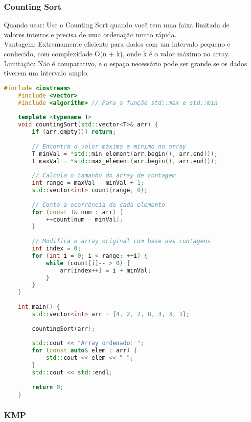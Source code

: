 \documentclass{article}
\begin{document}
\subsubsection{Counting Sort}

Quando usar: Use o Counting Sort quando você tem uma faixa limitada de valores inteiros e precisa de uma ordenação muito rápida.
\\Vantagem: Extremamente eficiente para dados com um intervalo pequeno e conhecido, com complexidade O(n + k), onde k é o valor máximo no array.
\\Limitação: Não é comparativo, e o espaço necessário pode ser grande se os dados tiverem um intervalo amplo.

\begin{lstlisting}[language=C++, caption=counting sort]
    #include <iostream>
    #include <vector>
    #include <algorithm> // Para a função std::max e std::min
    
    template <typename T>
    void countingSort(std::vector<T>& arr) {
        if (arr.empty()) return;
    
        // Encontra o valor máximo e mínimo no array
        T minVal = *std::min_element(arr.begin(), arr.end());
        T maxVal = *std::max_element(arr.begin(), arr.end());
    
        // Calcula o tamanho do array de contagem
        int range = maxVal - minVal + 1;
        std::vector<int> count(range, 0);
    
        // Conta a ocorrência de cada elemento
        for (const T& num : arr) {
            ++count[num - minVal];
        }
    
        // Modifica o array original com base nas contagens
        int index = 0;
        for (int i = 0; i < range; ++i) {
            while (count[i]-- > 0) {
                arr[index++] = i + minVal;
            }
        }
    }
    
    int main() {
        std::vector<int> arr = {4, 2, 2, 8, 3, 3, 1};
    
        countingSort(arr);
    
        std::cout << "Array ordenado: ";
        for (const auto& elem : arr) {
            std::cout << elem << " ";
        }
        std::cout << std::endl;
    
        return 0;
    }
\end{lstlisting}

\subsubsection{KMP}
\end{document}
